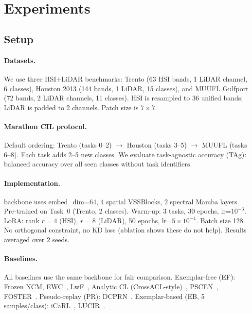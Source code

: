 \section{Experiments}
\label{sec:experiments}

\subsection{Setup}

\paragraph{Datasets.}
We use three HSI+LiDAR benchmarks: Trento (63 HSI bands, 1 LiDAR channel, 6 classes), Houston 2013 (144 bands, 1 LiDAR, 15 classes), and MUUFL Gulfport (72 bands, 2 LiDAR channels, 11 classes). HSI is resampled to 36 unified bands; LiDAR is padded to 2 channels. Patch size is $7\times7$.

\paragraph{Marathon CIL protocol.}
Default ordering: Trento (tasks 0--2) $\to$ Houston (tasks 3--5) $\to$ MUUFL (tasks 6--8). Each task adds 2--5 new classes. We evaluate task-agnostic accuracy (TAg): balanced accuracy over all seen classes without task identifiers.

\paragraph{Implementation.}
\backbonename{} backbone uses embed\_dim=64, 4 spatial VSSBlocks, 2 spectral Mamba layers. Pre-trained on Task~0 (Trento, 2 classes). Warm-up: 3 tasks, 30 epochs, lr=$10^{-3}$. LoRA: rank $r{=}4$ (HSI), $r{=}8$ (LiDAR), 50 epochs, lr=$5{\times}10^{-4}$. Batch size 128. No orthogonal constraint, no KD loss (ablation shows these do not help). Results averaged over 2 seeds.

\paragraph{Baselines.}
All baselines use the same \backbonename{} backbone for fair comparison. Exemplar-free (EF): Frozen NCM, EWC~\cite{kirkpatrick2017ewc}, LwF~\cite{li2017lwf}, Analytic CL (CrossACL-style)~\cite{xu2025crossacl}, PSCEN~\cite{pscen2025}, FOSTER~\cite{wang2022foster}. Pseudo-replay (PR): DCPRN~\cite{deng2024dcprn}. Exemplar-based (EB, 5 samples/class): iCaRL~\cite{rebuffi2017icarl}, LUCIR~\cite{hou2019lucir}.

